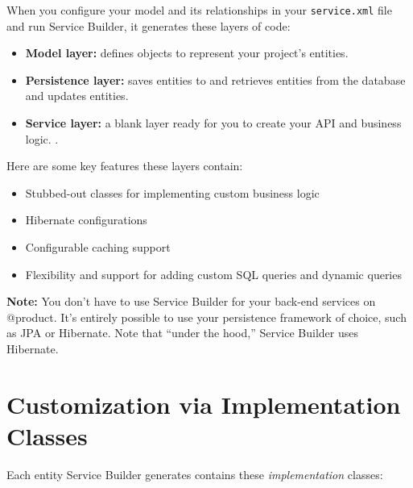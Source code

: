 When you configure your model and its relationships in your
\texttt{service.xml} file and run Service Builder, it generates these
layers of code:

\begin{itemize}
\item
  \textbf{Model layer:} defines objects to represent your project's
  entities.
\item
  \textbf{Persistence layer:} saves entities to and retrieves entities
  from the database and updates entities.
\item
  \textbf{Service layer:} a blank layer ready for you to create your API
  and business logic. .
\end{itemize}

Here are some key features these layers contain:

\begin{itemize}
\item
  Stubbed-out classes for implementing custom business logic
\item
  Hibernate configurations
\item
  Configurable caching support
\item
  Flexibility and support for adding custom SQL queries and dynamic
  queries
\end{itemize}

\noindent\hrulefill

\textbf{Note:} You don't have to use Service Builder for your back-end
services on @product. It's entirely possible to use your persistence
framework of choice, such as JPA or Hibernate. Note that ``under the
hood,'' Service Builder uses Hibernate.

\noindent\hrulefill

\section{Customization via Implementation
Classes}\label{customization-via-implementation-classes}

Each entity Service Builder generates contains these
\emph{implementation} classes:

